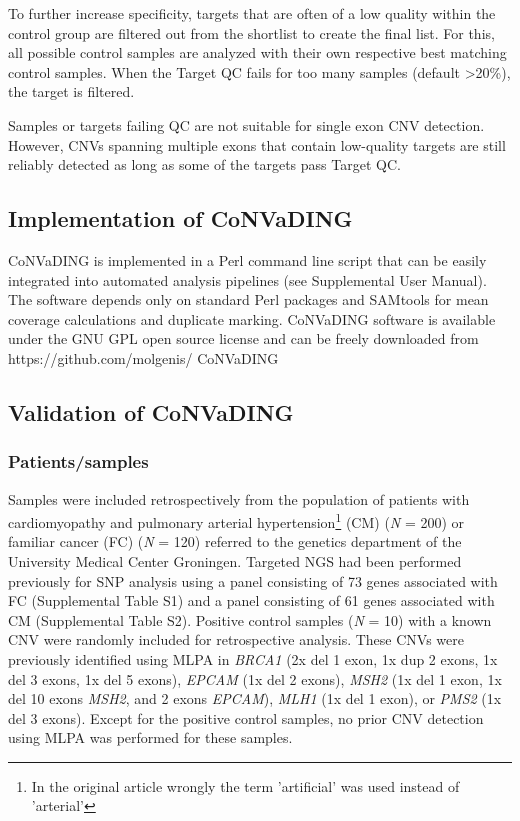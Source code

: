 To further increase specificity, targets that are often of a low quality within the control group are filtered out from the shortlist to create the final list. 
For this, all possible control samples are analyzed with their own respective best matching control samples. When the Target QC fails for too many samples (default \textgreater20\%), the target is filtered. 

Samples or targets failing QC are not suitable for single exon CNV detection. 
However, CNVs spanning multiple exons that contain low-quality targets are still reliably detected as long as some of the targets pass Target QC.

\subsection{Implementation of CoNVaDING}
CoNVaDING is implemented in a Perl command line script that can be easily integrated into automated analysis pipelines (see Supplemental User Manual).
The software depends only on standard Perl packages and SAMtools \cite{Li_2009} for mean coverage calculations and duplicate marking. 
CoNVaDING software is available under the GNU GPL open source license and can be freely downloaded from https://github.com/molgenis/ CoNVaDING

\subsection{Validation of CoNVaDING}

\subsubsection{Patients/samples}
Samples were included retrospectively from the population of patients with cardiomyopathy and pulmonary arterial hypertension\footnote{In the original article wrongly the term 'artificial' was used instead of 'arterial'} (CM) (\textsl{N} = 200) or familiar cancer (FC) (\textsl{N} = 120) referred to the genetics department of the University Medical Center Groningen. 
Targeted NGS had been performed previously for SNP analysis using a panel consisting of 73 genes associated with FC (Supplemental Table S1) and a panel consisting of 61 genes associated with CM (Supplemental Table S2). 
Positive control samples (\textsl{N} = 10) with a known CNV were randomly included for retrospective analysis. These CNVs were previously identified using MLPA in \textsl{BRCA1} (2x del 1 exon, 1x dup 2 exons, 1x del 3 exons, 1x del 5 exons), \textsl{EPCAM} (1x del 2 exons), \textsl{MSH2} (1x del 1 exon, 1x del 10 exons \textsl{MSH2}, and 2 exons \textsl{EPCAM}), \textsl{MLH1} (1x del 1 exon), or \textsl{PMS2} (1x del 3 exons). 
Except for the positive control samples, no prior CNV detection using MLPA was performed for these samples. 

